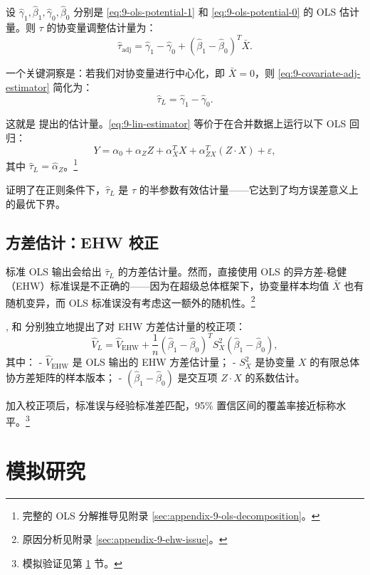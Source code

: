 设 $\hat{\gamma}_1, \hat{\beta}_1, \hat{\gamma}_0, \hat{\beta}_0$ 分别是 \cref{eq:9-ols-potential-1} 和 \cref{eq:9-ols-potential-0} 的 OLS 估计量。则 $\tau$ 的协变量调整估计量为：
\[
\hat{\tau}_{\mathrm{adj}} = \hat{\gamma}_1 - \hat{\gamma}_0 + (\hat{\beta}_1 - \hat{\beta}_0)^T \bar{X}.
\label{eq:9-covariate-adj-estimator}
\]

一个关键洞察是：若我们对协变量进行中心化，即 $\bar{X} = 0$，则 \cref{eq:9-covariate-adj-estimator} 简化为：
\[
\hat{\tau}_L = \hat{\gamma}_1 - \hat{\gamma}_0.
\label{eq:9-lin-estimator}
\]

这就是 \citet{Lin:2013} 提出的估计量。\cref{eq:9-lin-estimator} 等价于在合并数据上运行以下 OLS 回归：
\[
Y = \alpha_0 + \alpha_Z Z + \alpha_X^T X + \alpha_{ZX}^T (Z \cdot X) + \varepsilon,
\label{eq:9-pooled-ols}
\]
其中 $\hat{\tau}_L = \hat{\alpha}_Z$。\footnote{完整的 OLS 分解推导见附录 \cref{sec:appendix-9-ols-decomposition}。}

\citet{Lin:2013} 证明了在正则条件下，$\hat{\tau}_L$ 是 $\tau$ 的半参数有效估计量——它达到了均方误差意义上的最优下界。

\subsection{方差估计：EHW 校正}\label{sec:9-ehw-correction}

标准 OLS 输出会给出 $\hat{\tau}_L$ 的方差估计量。然而，直接使用 OLS 的异方差-稳健（EHW）标准误是不正确的——因为在超级总体框架下，协变量样本均值 $\bar{X}$ 也有随机变异，而 OLS 标准误没有考虑这一额外的随机性。\footnote{原因分析见附录 \cref{sec:appendix-9-ehw-issue}。}

\citet{Berk et al.:2013}, \citet{NegiWooldridge:2021} 和 \citet{ZhaoDing:2021a} 分别独立地提出了对 EHW 方差估计量的校正项：
\[
\hat{V}_L = \hat{V}_{\mathrm{EHW}} + \frac{1}{n}(\hat{\beta}_1 - \hat{\beta}_0)^T S_X^2 (\hat{\beta}_1 - \hat{\beta}_0),
\label{eq:9-variance-correction}
\]
其中：
- $\hat{V}_{\mathrm{EHW}}$ 是 OLS 输出的 EHW 方差估计量；
- $S_X^2$ 是协变量 $X$ 的有限总体协方差矩阵的样本版本；
- $(\hat{\beta}_1 - \hat{\beta}_0)$ 是交互项 $Z \cdot X$ 的系数估计。

加入校正项后，标准误与经验标准差匹配，95\% 置信区间的覆盖率接近标称水平。\footnote{模拟验证见第 \ref{sec:9-simulation} 节。}

\section{模拟研究}\label{sec:9-simulation}

